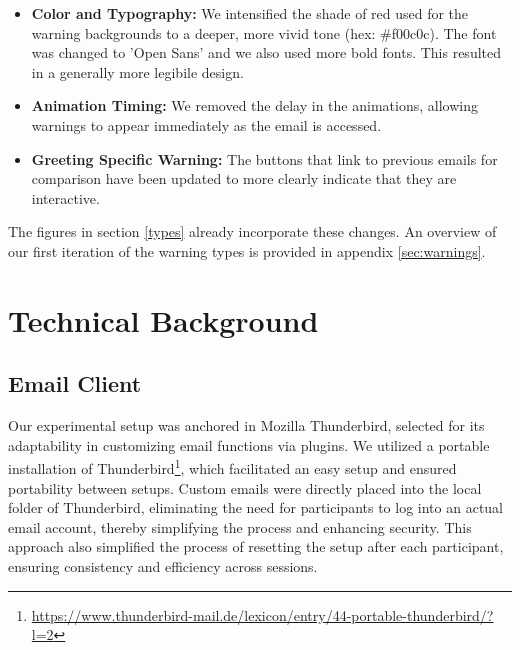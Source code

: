 \documentclass[
  a4paper,  %
  twoside,  %
  bibliography=totoc,
  headsepline,
  cleardoublepage=empty,
  parskip=half,
  draft=false
]{scrbook}
\begin{document}
\begin{itemize}
    \item \textbf{Color and Typography:} We intensified the shade of red used for the warning backgrounds to a deeper, more vivid tone (hex: \#f00c0c). The font was changed to 'Open Sans' and we also used more bold fonts. This resulted in a generally more legibile design.
    \item \textbf{Animation Timing:} We removed the delay in the animations, allowing warnings to appear immediately as the email is accessed.
    \item \textbf{Greeting Specific Warning:} 
    The buttons that link to previous emails for comparison have been updated to more clearly indicate that they are interactive.
\end{itemize}

The figures in section \ref{types} already incorporate these changes. An overview of our first iteration of the warning types is provided in appendix \ref{sec:warnings}.

\section{Technical Background}
\subsection{Email Client}
Our experimental setup was anchored in Mozilla Thunderbird, selected for its adaptability in customizing email functions via plugins. We utilized a portable installation of Thunderbird\footnote{\href{https://www.thunderbird-mail.de/lexicon/entry/44-portable-thunderbird/?l=2}{https://www.thunderbird-mail.de/lexicon/entry/44-portable-thunderbird/?l=2}}, which facilitated an easy setup and ensured portability between setups. Custom emails were directly placed into the local folder of Thunderbird, eliminating the need for participants to log into an actual email account, thereby simplifying the process and enhancing security. This approach also simplified the process of resetting the setup after each participant, ensuring consistency and efficiency across sessions.
\end{document}
